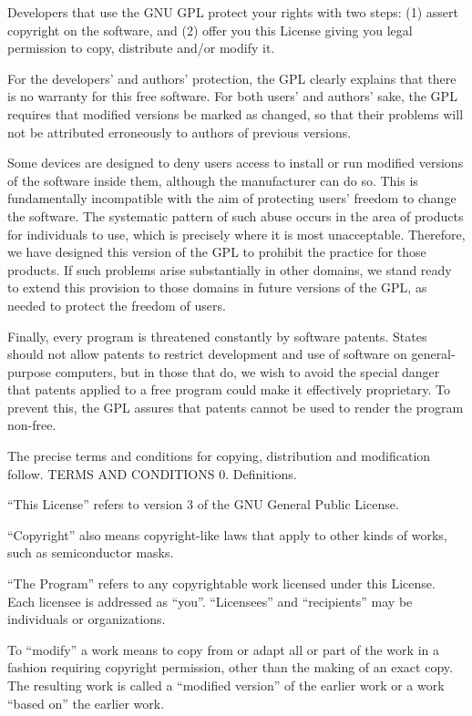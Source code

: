 {\begin{multicols}{4}
Developers that use the GNU GPL protect your rights with two steps: (1) assert copyright on the software, and (2) offer you this License giving you legal permission to copy, distribute and/or modify it.

For the developers' and authors' protection, the GPL clearly explains that there is no warranty for this free software. For both users' and authors' sake, the GPL requires that modified versions be marked as changed, so that their problems will not be attributed erroneously to authors of previous versions.

Some devices are designed to deny users access to install or run modified versions of the software inside them, although the manufacturer can do so. This is fundamentally incompatible with the aim of protecting users' freedom to change the software. The systematic pattern of such abuse occurs in the area of products for individuals to use, which is precisely where it is most unacceptable. Therefore, we have designed this version of the GPL to prohibit the practice for those products. If such problems arise substantially in other domains, we stand ready to extend this provision to those domains in future versions of the GPL, as needed to protect the freedom of users.

Finally, every program is threatened constantly by software patents. States should not allow patents to restrict development and use of software on general-purpose computers, but in those that do, we wish to avoid the special danger that patents applied to a free program could make it effectively proprietary. To prevent this, the GPL assures that patents cannot be used to render the program non-free.

The precise terms and conditions for copying, distribution and modification follow.
TERMS AND CONDITIONS
0. Definitions.

“This License” refers to version 3 of the GNU General Public License.

“Copyright” also means copyright-like laws that apply to other kinds of works, such as semiconductor masks.

“The Program” refers to any copyrightable work licensed under this License. Each licensee is addressed as “you”. “Licensees” and “recipients” may be individuals or organizations.

To “modify” a work means to copy from or adapt all or part of the work in a fashion requiring copyright permission, other than the making of an exact copy. The resulting work is called a “modified version” of the earlier work or a work “based on” the earlier work.


\end{multicols}}
